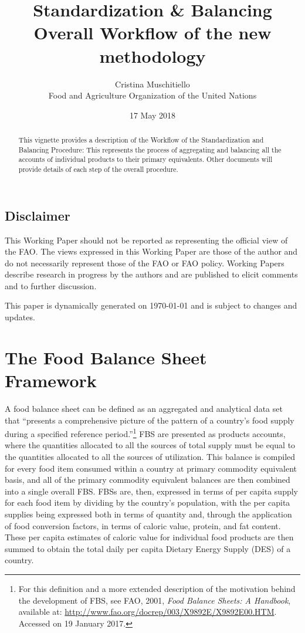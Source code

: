 \documentclass[]{article}
\title{Standardization \& Balancing\\
Overall Workflow of the new methodology}
\author{Cristina Muschitiello\\
Food and Agriculture Organization of the United Nations}
\date{17 May 2018}
\let\rmarkdownfootnote\footnote%
\def\footnote{\protect\rmarkdownfootnote}
\begin{document}
\maketitle
\begin{abstract}
This vignette provides a description of the Workflow of the
Standardization and Balancing Procedure: This represents the process of
aggregating and balancing all the accounts of individual products to
their primary equivalents. Other documents will provide details of each
step of the overall procedure.
\end{abstract}

{
\setcounter{tocdepth}{4}
\tableofcontents
}
\subsection*{Disclaimer}\label{disclaimer}

This Working Paper should not be reported as representing the official
view of the FAO. The views expressed in this Working Paper are those of
the author and do not necessarily represent those of the FAO or FAO
policy. Working Papers describe research in progress by the authors and
are published to elicit comments and to further discussion.

This paper is dynamically generated on \today{} and is subject to
changes and updates.

\newpage

\section*{The Food Balance Sheet
Framework}\label{the-food-balance-sheet-framework}

A food balance sheet can be defined as an aggregated and analytical data
set that ``presents a comprehensive picture of the pattern of a
country's food supply during a specified reference period.''\footnote{For
  this definition and a more extended description of the motivation
  behind the development of FBS, see FAO, 2001, \emph{Food Balance
  Sheets: A Handbook}, available at:
  \url{http://www.fao.org/docrep/003/X9892E/X9892E00.HTM}. Accessed on
  19 January 2017.} FBS are presented as products accounts, where the
quantities allocated to all the sources of total supply must be equal to
the quantities allocated to all the sources of utilization. This balance
is compiled for every food item consumed within a country at primary
commodity equivalent basis, and all of the primary commodity equivalent
balances are then combined into a single overall FBS. FBSs are, then,
expressed in terms of per capita supply for each food item by dividing
by the country's population, with the per capita supplies being
expressed both in terms of quantity and, through the application of food
conversion factors, in terms of caloric value, protein, and fat content.
These per capita estimates of caloric value for individual food products
are then summed to obtain the total daily per capita Dietary Energy
Supply (DES) of a country.
\end{document}
